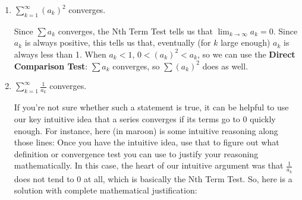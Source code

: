 \documentclass[main]{subfiles}
\begin{document}
\begin{enumerate}
\begin{enumerate}
    \begin{solution}
        We can use direct comparison.  For $k \geq
      1000$, $0 < \frac{a_k}{k} < a_k$.  Since $\sum a_k$ converges, the
      \textbf{Direct Comparison Test} says that $\sum \frac{a_k}{k}$
      converges, too.
    \end{solution}
    
    
    
    
     \item
    \begin{problem}[\vfill]
      $\displaystyle\sum_{k=1}^{\infty} (a_k)^2$ converges.         
    \end{problem}

    \begin{solution}

        Since $\sum a_k$ converges, the Nth Term Test
      tells us that $\displaystyle \lim_{k \to \infty} a_k = 0$.  Since
      $a_k$ is always positive, this tells us that, eventually (for $k$
      large enough) $a_k$ is always less than 1.  When $a_k < 1$, $0 <
      (a_k)^2 < a_k$, so we can use the \textbf{Direct Comparison Test}:
      $\sum a_k$ converges, so $\sum (a_k)^2$ does as well.
    \end{solution}





  \item \label{spring2007-midterm2-3-modified-1}
    \begin{problem}[\vfill]
      $\displaystyle\sum_{k=1}^{\infty} \frac{1}{a_k}$ converges.  
    \end{problem}

    \begin{solution} 
      If you're not sure whether such a statement is true, it can be
      helpful to use our key intuitive idea that a series converges if its
      terms go to 0 quickly enough.  For instance, here (in maroon) is
      some intuitive reasoning along those lines:   Once you have the intuitive idea,
      use that to figure out what definition or convergence test you can
      use to justify your reasoning mathematically.  In this case, the
      heart of our intuitive argument was that $\frac{1}{a_k}$ does not
      tend to 0 at all, which is basically the Nth Term Test.  So, here is
      a solution with complete mathematical justification:


\end{solution}
\end{enumerate}
\end{enumerate}
\end{document}

